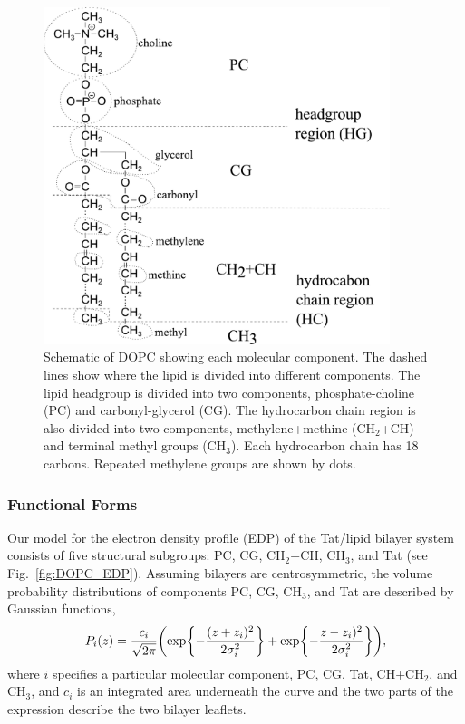 \begin{figure}[htbp]
  \centering
  \includegraphics[width=0.9\textwidth]{figures/Tat/MMs/dopc_schematic.pdf}
  \caption[Schematic of DOPC showing each molecular component]
  {Schematic of DOPC showing each molecular component. The dashed lines 
  show where the lipid is divided into different components. 
  The lipid headgroup
  is divided into two components, phosphate-choline (PC) and carbonyl-glycerol (CG). 
  The hydrocarbon chain region is also divided
  into two components, methylene+methine (CH$_2$+CH) and terminal methyl groups (CH$_3$).
  Each hydrocarbon chain has 18 carbons. Repeated methylene groups 
  are shown by dots.}
  \label{fig:dopc_schematic}
\end{figure}

\subsubsection{Functional Forms}
Our model for the electron density profile (EDP)
of the Tat/lipid bilayer system consists of five structural subgroups: PC, CG,
CH$_2$+CH, CH$_3$, and Tat (see Fig.~\ref{fig:DOPC_EDP}).
Assuming bilayers are centrosymmetric, 
the volume probability distributions of components PC, CG, CH$_3$, and Tat 
are described by Gaussian functions,
\begin{equation}
  P_i(z)=\frac{c_i}{\sqrt{2\pi}}\mathopen{}\left( 
    \exp\mathopen{}\left\lbrace -\frac{(z+z_i)^2}{2\sigma_i^2} \right\rbrace\mathclose{}
	+ \exp\mathopen{}\left\lbrace -\frac{z-z_i)^2}{2\sigma_i^2} \right\rbrace\mathclose{}
   \right)\mathclose{},
\end{equation}
where $i$ specifies a particular molecular component,
PC, CG, Tat, CH+CH$_2$, and CH$_3$, and
$c_i$ is an integrated area underneath the curve and the two parts of the 
expression describe the two bilayer leaflets. 

